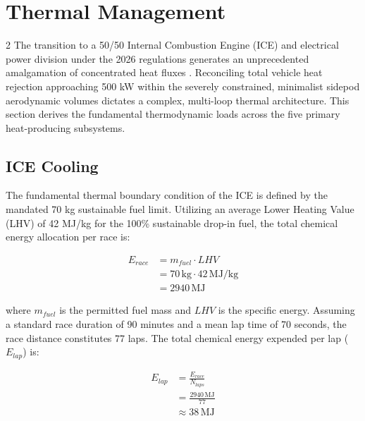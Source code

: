 \section{Thermal Management}

\begin{multicols}{2}
The transition to a 50/50 Internal Combustion Engine (ICE) and electrical power division under the 2026 regulations generates an unprecedented amalgamation of concentrated heat fluxes \cite{FIA_2026_PU_Regulations}. Reconciling total vehicle heat rejection approaching 500 kW within the severely constrained, minimalist sidepod aerodynamic volumes dictates a complex, multi-loop thermal architecture. This section derives the fundamental thermodynamic loads across the five primary heat-producing subsystems.

\subsection{ICE Cooling}

The fundamental thermal boundary condition of the ICE is defined by the mandated 70 kg sustainable fuel limit. Utilizing an average Lower Heating Value (LHV) of 42 MJ/kg for the 100\% sustainable drop-in fuel, the total chemical energy allocation per race is:

\begin{equation} \label{eq:total_fuel_energy}
\begin{split}
E_{race} &= m_{fuel} \cdot LHV \\
&= 70\,\mathrm{kg} \cdot 42\,\mathrm{MJ/kg} \\
&= 2940\,\mathrm{MJ}
\end{split}
\end{equation}

where $m_{fuel}$ is the permitted fuel mass and $LHV$ is the specific energy. Assuming a standard race duration of 90 minutes and a mean lap time of 70 seconds, the race distance constitutes 77 laps. The total chemical energy expended per lap ($E_{lap}$) is:

\begin{equation} \label{eq:energy_per_lap}
\begin{split}
E_{lap} &= \frac{E_{race}}{N_{laps}} \\
&= \frac{2940\,\mathrm{MJ}}{77} \\
&\approx 38\,\mathrm{MJ}
\end{split}
\end{equation}


\end{multicols}
